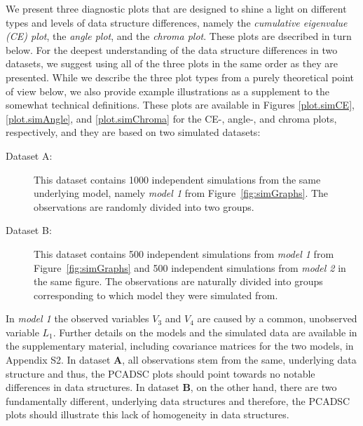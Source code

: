 \documentclass[a4paper,12pt]{article}
\begin{document}
We present three diagnostic plots that are designed to shine a light on different types and levels of data structure differences, namely the \textit{cumulative eigenvalue (CE) plot}, the \textit{angle plot}, and the \textit{chroma plot}. These plots are dsecribed in turn below. For the deepest understanding of the data structure differences in two datasets, we suggest using all of the three plots in the same order as they are presented. While we describe the three plot types from a purely theoretical point of view below, we also provide example illustrations as a supplement to the somewhat technical definitions. These plots are available in Figures \ref{plot.simCE}, \ref{plot.simAngle}, and \ref{plot.simChroma} for the CE-, angle-, and chroma plots, respectively, and they are based on two simulated datasets:
\begin{description}
\item[Dataset A:] This dataset contains 1000 independent simulations from the same underlying model, namely \textit{model 1} from Figure~\ref{fig:simGraphs}. The observations are randomly divided into two groups.
\item[Dataset B:] This dataset contains 500 independent simulations from \textit{model 1} from Figure~\ref{fig:simGraphs} and 500 independent simulations from \textit{model 2} in the same figure. The observations are naturally divided into groups corresponding to which model they were simulated from.
\end{description}

In \textit{model 1} the observed variables $V_3$ and $V_4$ are caused by a common, unobserved variable $L_1$. Further details on the models and the simulated data are available in the supplementary material, including covariance matrices for the two models, in Appendix S2. In dataset $\mathbf{A}$, all observations stem from the same, underlying data structure and thus, the PCADSC plots should point towards no notable differences in data structures. In dataset $\mathbf{B}$, on the other hand, there are two fundamentally different, underlying data structures and therefore, the PCADSC plots should illustrate this lack of homogeneity in data structures.


\end{document}
